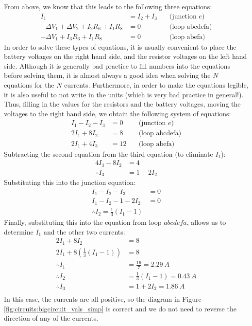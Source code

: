 \begin{example}
From above, we know that this leads to the following three equations:
\begin{align*}
I_1 &= I_2+I_3 \quad &\text{(junction $e$)}\\
-\Delta V_1+\Delta V_2+I_2R_6+I_1R_8&=0\quad&\text{(loop abcdefa)}\\
-\Delta V_1+I_3R_3+I_1R_8&=0\quad&\text{(loop abefa)}
\end{align*}
In order to solve these types of equations, it is usually convenient to place the battery voltages on the right hand side, and the resistor voltages on the left hand side. Although it is generally bad practice to fill numbers into the equations before solving them, it is almost always a good idea when solving the $N$ equations for the $N$ currents. Furthermore, in order to make the equations legible, it is also useful to not write in the units (which is very bad practice in general!). Thus, filling in the values for the resistors and the battery voltages, moving the voltages to the right hand side, we obtain the following system of equations:
\begin{align*}
I_1-I_2-I_3&=0  \quad &\text{(junction $e$)}\\
2I_1+8I_2&=8 \quad&\text{(loop abcdefa)}\\
2I_1+4I_3&=12 \quad&\text{(loop abefa)}
\end{align*}
Subtracting the second equation from the third equation (to eliminate $I_1$):
\begin{align*}
4I_3-8I_2&=4\\
\therefore I_3&=1+2I_2
\end{align*}
Substituting this into the junction equation:
\begin{align*}
I_1-I_2-I_3&=0\\
I_1-I_2-1-2I_2&=0\\
\therefore I_2=\frac{1}{3}(I_1-1)
\end{align*}
Finally, substituting this into the equation from loop $abcdefa$, allows us to determine $I_1$ and the other two currents:
\begin{align*}
2I_1+8I_2&=8\\
2I_1+8\left(\frac{1}{3}(I_1-1) \right)&=8\\
\therefore I_1&=\frac{16}{7}=\SI{2.29}{A}\\
\therefore I_2&=\frac{1}{3}(I_1-1)=\SI{0.43}{A}\\
\therefore I_3&=1+2I_2=\SI{1.86}{A}\\
\end{align*}
In this case, the currents are all positive, so the diagram in Figure \ref{fig:circuits:bigcircuit_vals_simp} is correct and we do not need to reverse the direction of any of the currents. 


\end{example}
